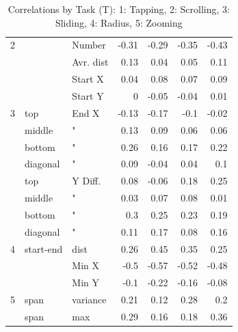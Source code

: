 \documentclass{sigchi}
\begin{document}
\begin{table}[ht]
\begin{tabular}{|lll|rrrr|}
    2    & ~          & Number    & -0.31 & -0.29  & -0.35  & \cellcolor[gray]{0.9}-0.43 \\
    ~    & ~          & Avr. dist & 0.13  & 0.04   & 0.05   & 0.11  \\
    ~    & ~          & Start X   & 0.04  & 0.08   & 0.07   & 0.09  \\
    ~    & ~          & Start Y   & 0     & -0.05  & -0.04  & 0.01  \\ \hline
    3    & top  			& End X     & -0.13 & -0.17  & -0.1   & -0.02 \\
    ~    & middle  		& "         & 0.13  & 0.09   & 0.06   & 0.06  \\
    ~    & bottom 		& "         & 0.26  & 0.16   & 0.17   & 0.22  \\
    ~    & diagonal 	& "         & 0.09  & -0.04  & 0.04   & 0.1   \\
    ~    & top  			& Y Diff.   & 0.08  & -0.06		& 0.18   & 0.25  \\
    ~    & middle  		& "         & 0.03  & 0.07   & 0.08   & 0.01  \\
    ~    & bottom 		& "         & 0.3   & 0.25   & 0.23   & 0.19  \\
    ~    & diagonal 	& "         & 0.11  & 0.17   & 0.08   & 0.16  \\ \hline
    4    & start-end 	& dist      & 0.26  & \cellcolor[gray]{0.9}0.45   & 0.35   & 0.25  \\
    ~    & ~          & Min X     & -0.5  & \cellcolor[gray]{0.9}-0.57  & -0.52  & -0.48 \\
    ~    & ~          & Min Y     & -0.1  & -0.22  & -0.16  & -0.08 \\ \hline
    5    & span       & variance  & 0.21  & 0.12   & 0.28   & 0.2   \\
    ~    & span       & max       & 0.29  & 0.16   & 0.18   & \cellcolor[gray]{0.9}0.36  \\ \hline
    \end{tabular}
		\caption{Correlations by Task (T): 1: Tapping, 2: Scrolling, 3: Sliding, 4: Radius, 5: Zooming }
		\label{allCorrelations}
\end{table}
\end{document}
